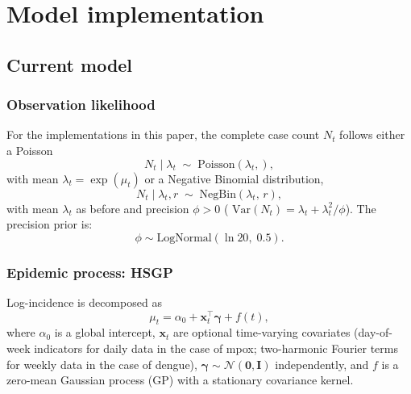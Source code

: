 \documentclass{article}
\begin{document}
\section{Model implementation}

\subsection{Current model}

\subsubsection*{Observation likelihood}

For the implementations in this paper, the complete case count $N_t$ follows either a Poisson
\begin{equation}
  N_t \mid \lambda_t \;\sim\; \mathrm{Poisson}\!\left(\lambda_t,\right),
\end{equation}
with mean $\lambda_t = \exp(\mu_t)$ or a Negative Binomial  distribution,
\begin{equation}
  N_t \mid \lambda_t, r \;\sim\; \mathrm{NegBin}\!\left(\lambda_t,\, r\right),
\end{equation}
with mean $\lambda_t$ as before and precision $\phi > 0$ (
$\mathrm{Var}(N_t) = \lambda_t + \lambda_t^2/\phi$).  The precision prior is:
\begin{equation}
  \phi \sim \mathrm{LogNormal}(\ln 20,\; 0.5).
\end{equation}


\subsubsection*{Epidemic process: HSGP}

Log-incidence is decomposed as
\begin{equation}\label{eq:mu}
  \mu_t = \alpha_0 + \mathbf{x}_t^{\top}\boldsymbol{\gamma} + f(t),
\end{equation}
where $\alpha_0$ is a global intercept, $\mathbf{x}_t$ are optional time-varying
covariates (day-of-week indicators for daily data in the case of mpox; two-harmonic Fourier terms for
weekly data in the case of dengue), $\boldsymbol{\gamma} \sim \mathcal{N}(\mathbf{0}, \mathbf{I})$
independently, and $f$ is a zero-mean Gaussian process (GP) with a stationary covariance kernel.
\end{document}
